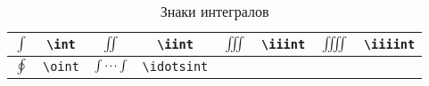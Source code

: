 \begin{table}
	\begin{tabular}{||c|c||c|c||c|c||c|c||}
		\hline $\int$ & \Verb|\int| 
		& $\iint$ & \Verb|\iint| 
		& $\iiint$ & \Verb|\iiint| 
		& $\iiiint$ & \Verb|\iiiint| \\
		\hline  $\oint$ & \Verb|\oint| 
		& $\idotsint$ & \Verb|\idotsint| 
		& &  
		& & \\ 
		\hline
	\end{tabular}
	\caption{Знаки интегралов}
\end{table}